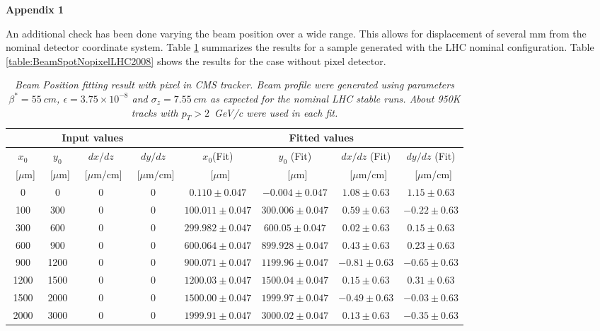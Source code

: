 \documentclass{cmspaper}
\begin{document}
{\Large \bf Appendix 1}

An additional check has been done varying the beam position over a wide range. This allows for displacement of several mm from the nominal detector 
coordinate system. Table \ref{table:BeamSpotLHC2008} summarizes the results
for a sample generated with the LHC nominal configuration. Table \ref{table:BeamSpotNopixelLHC2008} shows the results for the case without pixel detector.

\begin{table} [th]
\caption{\it \label{table:BeamSpotLHC2008} Beam Position fitting result with pixel in CMS tracker. Beam profile 
were generated using parameters $\beta^* =  55~cm$, $\epsilon=3.75 \times 10^{-8}$ and 
$\sigma_z=7.55~cm$ as expected for the nominal LHC stable runs. About 950K tracks with $p_T>2$~GeV/c were 
used in each fit.}
\begin{center}
\begin{tabular}{|c|c|c|c|c|c|c|c|} \hline
\multicolumn{4}{|c|}{Input values}& \multicolumn{4}{|c|}{Fitted  values}\\ \hline
$x_0$& $y_0$& $dx/dz$&$dy/dz$ &  $x_0$(Fit) & $y_0$ (Fit) & $dx/dz$ (Fit) & $dy/dz$ (Fit) \\
~[$\mu$m] & ~[$\mu$m] & ~[$\mu$m/cm] & ~[$\mu$m/cm] & ~[$\mu$m] & ~[$\mu$m] & ~[$\mu$m/cm] & ~[$\mu$m/cm] \\ \hline
0   & 0   & 0 &    0 &$ 0.110  \pm 0.047$&$-0.004  \pm 0.047$&$1.08 \pm 0.63   $&$  1.15 \pm  0.63$\\ \hline
100 & 300 & 0 &    0 &$ 100.011\pm 0.047$&$300.006 \pm 0.047$&$0.59 \pm 0.63   $&$ -0.22 \pm  0.63 $\\ \hline
300 & 600 & 0 &    0 &$ 299.982\pm 0.047$&$600.05  \pm 0.047$&$0.02 \pm 0.63   $&$  0.15 \pm  0.63 $\\ \hline
600 & 900 & 0 &    0 &$ 600.064\pm 0.047$&$899.928 \pm 0.047$&$0.43 \pm 0.63   $&$  0.23 \pm  0.63 $\\ \hline
900 & 1200& 0 &    0 &$ 900.071\pm 0.047$&$1199.96 \pm 0.047$&$-0.81 \pm 0.63  $&$ -0.65 \pm  0.63$\\ \hline
1200& 1500& 0 &    0 &$ 1200.03\pm 0.047$&$1500.04 \pm 0.047$&$0.15  \pm  0.63 $&$  0.31 \pm  0.63$\\ \hline
1500& 2000& 0 &    0 &$ 1500.00\pm 0.047$&$1999.97 \pm 0.047$&$-0.49 \pm  0.63 $&$ -0.03 \pm  0.63$\\ \hline
2000& 3000& 0 &    0 &$ 1999.91\pm 0.047$&$3000.02 \pm 0.047$&$0.13  \pm  0.63$&$  -0.35 \pm  0.63$\\ \hline

\end{tabular}
\end{center}
\end{table}
\end{document}
